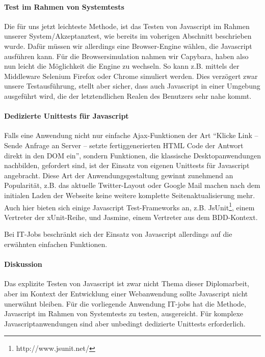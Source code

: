 \paragraph{Test im Rahmen von Systemtests} Die für uns jetzt leichteste Methode, ist das Testen von Javascript im Rahmen unserer System/Akzeptanztest, wie bereits im voherigen Abschnitt beschrieben wurde. Dafür müssen wir allerdings eine Browser-Engine wählen, die Javascript ausführen kann. Für die Browsersimulation nahmen wir Capybara, haben also nun leicht die Möglichkeit die Engine zu wechseln. So kann z.B. mittels der Middleware Selenium Firefox oder Chrome simuliert werden. Dies verzögert zwar unsere Testausführung, stellt aber sicher, dass auch Javascript in einer Umgebung ausgeführt wird, die der letztendlichen Realen des Benutzers sehr nahe kommt.

\paragraph{Dedizierte Unittests für Javascript} Falls eine Anwendung nicht nur einfache Ajax-Funktionen der Art "`Klicke Link -- Sende Anfrage an Server -- setzte fertiggenerierten HTML Code der Antwort direkt in den DOM ein"', sondern Funktionen, die klassische Desktopanwendungen nachbilden, gefordert sind, ist der Einsatz von eigenen Unittests für Javascript angebracht.
Diese Art der Anwendungsgestaltung gewinnt zunehmend an Popularität, z.B. das aktuelle Twitter-Layout oder Google Mail machen nach dem initialen Laden der Webseite keine weitere komplette Seitenaktualisierung mehr. 
Auch hier bieten sich einige Javascript Test-Frameworks an, z.B. JsUnit\footnote{http://www.jsunit.net/}, einem Vertreter der xUnit-Reihe, und Jasmine, einem Vertreter aus dem BDD-Kontext. %

Bei IT-Jobs beschränkt sich der Einsatz von Javascript allerdings auf die erwähnten einfachen Funktionen.

\paragraph{Diskussion} Das explizite Testen von Javascript ist zwar nicht Thema dieser Diplomarbeit, aber im Kontext der Entwicklung einer Webanwendung sollte Javascript nicht unerwähnt bleiben. Für die vorliegende Anwendung IT-jobs hat die Methode, Javascript im Rahmen von Systemtests zu testen, ausgereicht. Für komplexe Javascriptanwendungen sind aber unbedingt dedizierte Unittests erforderlich.
